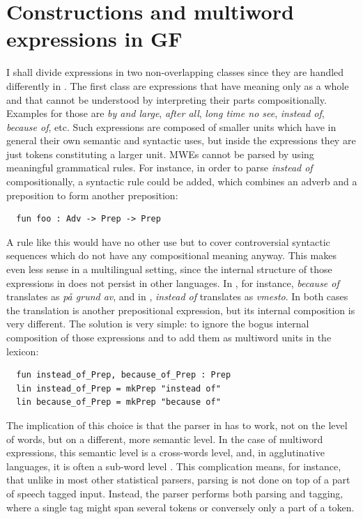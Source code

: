 \documentclass[output=paper]{langsci/langscibook}
\begin{document}
\section{Constructions and multiword expressions in GF}
\label{ang:mwe}

I shall divide expressions in two non-overlapping classes since 
they are handled differently in . The first class are expressions 
that have meaning only as a whole and that cannot be understood 
by interpreting their parts compositionally. 
Examples for those are \textit{by and large}, \textit{after all}, 
\textit{long time no see}, \textit{instead of}, \textit{because of}, etc.
Such expressions are composed of smaller units which have 
in general their own semantic and syntactic uses, but inside 
the expressions they are just tokens constituting a larger unit.
MWEs cannot be parsed by using meaningful grammatical rules.
For instance, in order to parse \textit{instead of} compositionally, 
a syntactic rule could be added, which combines an adverb and 
a preposition to form another preposition:
\begin{verbatim}
  fun foo : Adv -> Prep -> Prep
\end{verbatim}
A rule like this would have no other use but to cover controversial 
syntactic sequences which do not have any compositional meaning anyway.
This makes even less sense in a multilingual setting, since the internal
structure of those expressions in  does not persist in other
languages. In , for instance, \textit{because of} translates as 
\textit{p{\aa} grund av}, and in , \textit{instead of} translates 
as \textit{vmesto}. In both cases the translation is 
another prepositional expression, but its internal composition 
is very different. The solution is very simple: to ignore 
the bogus internal composition of those expressions and to add them as 
multiword units in the lexicon:
\begin{verbatim}
  fun instead_of_Prep, because_of_Prep : Prep
  lin instead_of_Prep = mkPrep "instead of"
  lin because_of_Prep = mkPrep "because of"
\end{verbatim}

The implication of this choice is that the parser in 
 \citep{angelov2011mechanics} has to work, not on the level of words, 
but on a different, more semantic level. In the case of 
multiword expressions, this semantic level is a cross-words level, and, 
in agglutinative languages, it is often a sub-word level \citep{angelov2015orthography}. 
This complication means, for instance, that unlike in
most other statistical parsers,  parsing is not done on top of 
a part of speech tagged input. Instead, the parser performs both parsing
and tagging, where a single tag might span several tokens or 
conversely only a part of a token.
\end{document}
